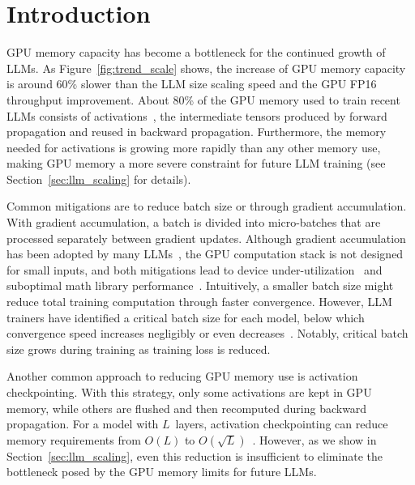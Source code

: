 \section{Introduction}
\label{sec:intro}


GPU memory capacity has become a bottleneck for the continued growth of LLMs.
As Figure~\ref{fig:trend_scale} shows, the increase of GPU memory capacity is around 60\% slower than the LLM size scaling speed and the GPU FP16 throughput improvement. About 80\% of the GPU memory used to train recent LLMs consists of activations~\cite{liuWinnerTakeAllColumnRow2023,korthikantiReducingActivationRecomputation2022}, the intermediate tensors produced by forward propagation and reused in backward propagation.
Furthermore, the memory needed for activations is growing more rapidly than any other memory use, making GPU memory a more severe constraint for future LLM training (see Section~\ref{sec:llm_scaling} for details).


Common mitigations are to reduce batch size or through gradient accumulation.  With gradient accumulation, a batch is divided into micro-batches that are processed separately between gradient updates.  Although gradient accumulation has been adopted by many LLMs~\cite{jiangMegaScaleScalingLarge2024,shoeybiMegatronLMTrainingMultiBillion2020a,workshopBLOOM176BParameterOpenAccess2023}, the GPU computation stack is not designed for small inputs, and both mitigations lead to device under-utilization~\cite{DissectingBatchingEffects,anthonyCaseCoDesigningModel2024} and suboptimal math library performance~\cite{aminabadiDeepSpeedInferenceEnabling2022}. 
Intuitively, a smaller batch size might reduce total training computation through faster convergence. However, LLM trainers have identified a critical batch size for each model, below which convergence speed increases negligibly or even decreases~\cite{kaplanScalingLawsNeural2020,mccandlishEmpiricalModelLargeBatch2018}.  Notably, critical batch size grows during training as training loss is reduced.

Another common approach to reducing GPU memory use is activation checkpointing.  With this strategy, only some activations are kept in GPU memory, while others are flushed and then recomputed during backward propagation.  For a model with $L$~layers, activation checkpointing can reduce memory requirements from $O(L)$ to $O(\sqrt{L})$~\cite{chenTrainingDeepNets2016}.  However, as we show in Section~\ref{sec:llm_scaling}, even this reduction is insufficient to eliminate the bottleneck posed by the GPU memory limits for future LLMs.



